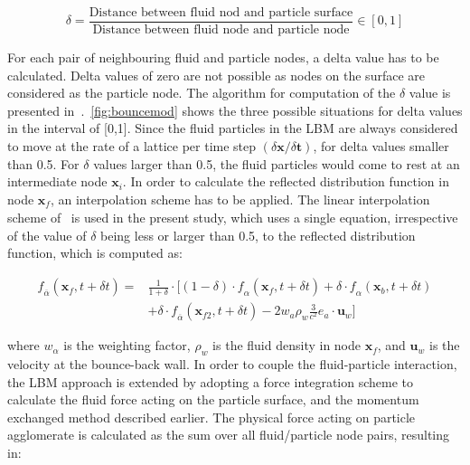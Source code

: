 \begin{equation}
\delta = \frac{\mbox{Distance between fluid nod and particle 
surface}}{\mbox{Distance between fluid node and particle node}} \in [0,1]
\end{equation} 

For each pair of neighbouring fluid and particle nodes, a delta value has to be 
calculated. Delta values of zero are not possible as nodes on the surface are 
considered as the particle node. The algorithm for computation of the $\delta$ 
value is presented in~\citet{Iglberger2008}.~\cref{fig:bouncemod} shows the 
three possible situations for delta values in the interval of [0,1]. Since the 
fluid particles in the LBM are always considered to move at the rate of a 
lattice per time step $(\delta \mathbf{x}/ \delta \mathbf{t})$, for delta 
values smaller than 0.5. For $\delta$ values larger than 0.5, the fluid 
particles would come to rest at an intermediate node $\mathbf{x}_{\mathit{i}}$. 
In order to calculate the reflected distribution function in node 
$\mathbf{x}_{\mathit{f}}$, an interpolation scheme has to be applied. The 
linear interpolation scheme of~\citet{Yu2003} is used in the present study, 
which uses a single equation, irrespective of the value of $\delta$ being less 
or larger than 0.5, to the reflected distribution function, which is computed 
as:

\begin{align}
 \nonumber
\mathit{\mathit{f}}_{\overline{\alpha}}(\mathbf{x}_{\mathit{f}},t + \delta t) = 
& \frac{1}{1 + \delta} \cdot [(1-\delta)\cdot 
\mathit{\mathit{f}}_{\alpha}(\mathbf{x}_{\mathit{f}},t + \delta t) + \delta 
\cdot \mathit{\mathit{f}}_{\alpha}(\mathbf{x}_{\mathit{b}},t + \delta t)  \\
& + \delta \cdot 
\mathit{\mathit{f}}_{\overline{\alpha}}(\mathbf{x}_{\mathit{f2}},t + \delta t) 
-2\mathit{w}_{\mathit{a}}\rho_{\mathit{w}}\frac{3}{\mathit{c}^{2}}\mathbf{\mathit{e}}_{\mathit{a}}\cdot
 \mathbf{u}_{\mathit{w}}]
\end{align}

where $\mathit{w}_{\alpha}$ is the weighting factor, $\rho_{\mathit{w}}$ is the 
fluid density in node $\mathbf{x}_{\mathit{f}}$, and $ \mathbf{u}_{\mathit{w}}  
$ is the velocity at the bounce-back wall. In order to couple the 
fluid-particle interaction, the LBM approach is extended by adopting a force 
integration scheme to calculate the fluid force acting on the particle surface, 
and the momentum exchanged method described earlier. The physical force acting 
on particle agglomerate is calculated as the sum over all fluid/particle node 
pairs, resulting in: 

